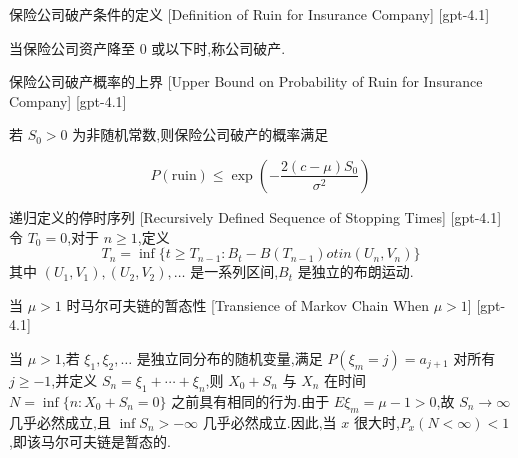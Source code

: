 \documentclass[UTF8]{ctexart}
\begin{document}
    
    
    \begin{dfn}
        {保险公司破产条件的定义}
        [Definition of Ruin for Insurance Company]
        [gpt-4.1]
        
当保险公司资产降至 $0$ 或以下时,称公司破产.

    \end{dfn}
    
    
    
    \begin{thm}
        {保险公司破产概率的上界}
        [Upper Bound on Probability of Ruin for Insurance Company]
        [gpt-4.1]
        
若 $S_0>0$ 为非随机常数,则保险公司破产的概率满足

\[
P(\mathrm{ruin}) \leq \exp\left( -\frac{2(c-\mu) S_{0}}{\sigma^{2}} \right)
\]

    \end{thm}
    
    
    
    \begin{dfn}
        {递归定义的停时序列}
        [Recursively Defined Sequence of Stopping Times]
        [gpt-4.1]
        令 $T_0 = 0$,对于 $n \geq 1$,定义
\[
T_n = \inf \{ t \geq T_{n-1} : B_t - B(T_{n-1}) 
otin ( U_n, V_n ) \}
\]
其中 $(U_1, V_1), (U_2, V_2), \ldots$ 是一系列区间,$B_t$ 是独立的布朗运动.
    \end{dfn}
    
    
    
    \begin{thm}
        {当 $\mu > 1$ 时马尔可夫链的暂态性}
        [Transience of Markov Chain When $\mu > 1$]
        [gpt-4.1]
        
当 $\mu > 1$,若 $\xi_1, \xi_2, \ldots$ 是独立同分布的随机变量,满足 $P(\xi_m = j) = a_{j+1}$ 对所有 $j \geq -1$,并定义 $S_n = \xi_1 + \cdots + \xi_n$,则 $X_0 + S_n$ 与 $X_n$ 在时间 $N = \operatorname*{inf} \{ n : X_0 + S_n = 0 \}$ 之前具有相同的行为.由于 $E\xi_m = \mu - 1 > 0$,故 $S_n \to \infty$ 几乎必然成立,且 $\inf S_n > -\infty$ 几乎必然成立.因此,当 $x$ 很大时,$P_x(N < \infty) < 1$,即该马尔可夫链是暂态的.

    \end{thm}
    
    
    
\end{document}
